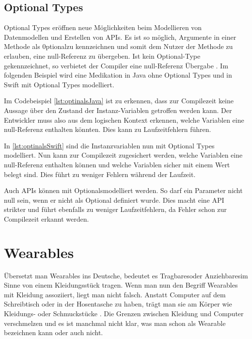 \subsection*{Optional Types}
\label{ch:optionals}
Optional Types eröffnen neue Möglichkeiten beim Modellieren von Datenmodellen und Erstellen von APIs. Es ist so möglich, Argumente in einer Methode als \glqq 0ptional\grqq  zu kennzeichnen und somit dem Nutzer der Methode zu erlauben, eine null-Referenz zu übergeben. Ist kein Optional-Type gekennzeichnet, so verbietet der Compiler eine null-Referenz Übergabe \cite{Apple:2014sp}. Im folgenden Beispiel wird eine Medikation in Java ohne Optional Types und in Swift mit Optional Types modelliert.
 

Im Codebeispiel \ref{lst:optinalsJava} ist zu erkennen, dass zur Compilezeit keine Aussage über den Zustand der Instanz-Variablen getroffen werden kann. Der Entwickler muss also aus dem logischen Kontext erkennen, welche Variablen eine null-Referenz enthalten könnten. Dies kann zu Laufzeitfehlern führen.


In \ref{lst:optinalsSwift} sind die Instanzvariablen nun mit Optional Types modelliert. Nun 
kann zur Compilezeit zugesichert werden, welche Variablen eine null-Referenz enthalten können und welche Variablen sicher mit einem Wert belegt sind. Dies führt zu weniger Fehlern während der Laufzeit.

Auch APIs können mit \glqq Optionals\grqq  modelliert werden. So darf ein Parameter nicht null sein, wenn er nicht als Optional definiert wurde. Dies macht eine API strikter und führt ebenfalls zu weniger Laufzeitfehlern, da Fehler schon zur Compilezeit erkannt werden.

\section{Wearables}
Übersetzt man Wearables ins Deutsche, bedeutet es \glqq Tragbares\grqq  oder \glqq Anziehbares\grqq  im Sinne von einem Kleidungsstück tragen. Wenn man nun den Begriff Wearables mit Kleidung assoziiert, liegt man nicht falsch. Anstatt Computer auf dem Schreibtisch oder in der Hosentasche zu haben, trägt man sie am Körper wie Kleidungs- oder Schmuckstücke \cite{Dvorak:2008aa}. Die Grenzen zwischen Kleidung und Computer verschmelzen und es ist manchmal nicht klar, was man schon als Wearable bezeichnen kann oder auch nicht.


